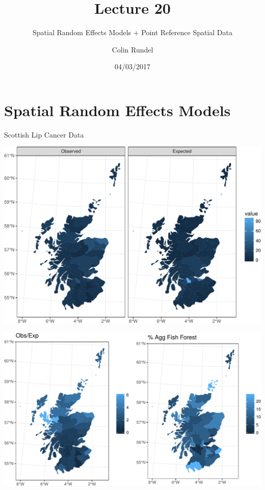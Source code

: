 \documentclass[11pt,ignorenonframetext,]{beamer}
\title{Lecture 20}
\subtitle{Spatial Random Effects Models + Point Reference Spatial Data}
\author{Colin Rundel}
\date{04/03/2017}
\begin{document}
\frame{\titlepage}

\section{Spatial Random Effects
Models}\label{spatial-random-effects-models}

\begin{frame}{Scottish Lip Cancer Data}

\includegraphics{Lec20_files/figure-beamer/unnamed-chunk-1-1.pdf}

\end{frame}

\begin{frame}{}

\includegraphics{Lec20_files/figure-beamer/unnamed-chunk-2-1.pdf}

\end{frame}
\end{document}
